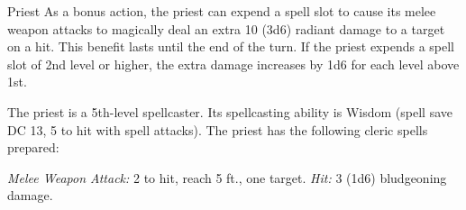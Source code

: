 \documentclass[10pt,a4paper,twoside,bg=print,twocolumn,openany,nodeprecatedcode]{dndbook}
\begin{document}
\begin{DndMonster}[float=t]{Priest}
\DndMonsterBasics[
armor-class = {13 (\textit{chain shirt})},
hit-points = {\DndDice{5d8 + 5}},
speed = {30 ft.}
]
\DndMonsterAbilityScores[
 str = 10,
 dex = 10,
 con = 12,
 int = 13,
 wis = 16,
 cha = 13
]
\DndMonsterDetails[
skills = {Medicine +7, Persuasion +3, Religion +5},
languages = {any two languages},
challenge = 2,
]
As a bonus action, the priest can expend a spell slot to cause its melee weapon attacks to magically deal an extra 10 (3d6) radiant damage to a target on a hit. This benefit lasts until the end of the turn. If the priest expends a spell slot of 2nd level or higher, the extra damage increases by 1d6 for each level above 1st.

The priest is a 5th-level spellcaster. Its spellcasting ability is Wisdom (spell save DC 13, 5 to hit with spell attacks). The priest has the following cleric spells prepared:
\begin{DndMonsterSpells}
\end{DndMonsterSpells}
\textsl{Melee Weapon Attack:} 2 to hit, reach 5 ft., one target. \textsl{Hit:} 3 (1d6) bludgeoning damage.

\end{DndMonster}
\end{document}
